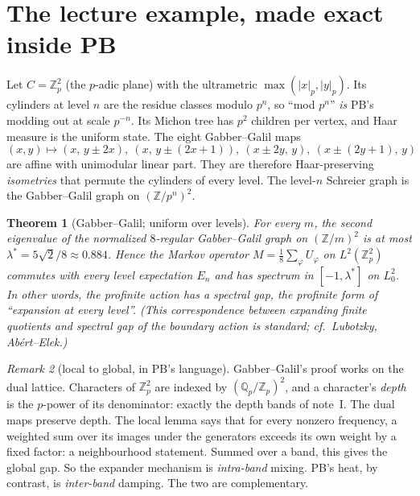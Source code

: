 \documentclass[11pt]{article}
\newtheorem{theorem}{Theorem}[section]
\theoremstyle{definition}
\theoremstyle{remark}
\newtheorem{remark}[theorem]{Remark}
\newcommand{\Z}{\mathbb Z}
\newcommand{\Q}{\mathbb Q}
\begin{document}
\section{The lecture example, made exact inside PB}\label{sec:gg}

Let $C=\Z_p^2$ (the $p$-adic plane) with the ultrametric $\max(|x|_p,|y|_p)$. Its cylinders at level $n$ are the residue classes modulo $p^n$, so ``mod $p^n$'' \emph{is} PB's modding out at scale $p^{-n}$. Its Michon tree has $p^2$ children per vertex, and Haar measure is the uniform state. The eight Gabber--Galil maps
\[(x,y)\mapsto(x,\,y\pm2x),\ (x,\,y\pm(2x+1)),\ (x\pm2y,\,y),\ (x\pm(2y+1),\,y)\]
are affine with unimodular linear part. They are therefore Haar-preserving \emph{isometries} that permute the cylinders of every level. The level-$n$ Schreier graph is the Gabber--Galil graph on $(\Z/p^n)^2$.

\begin{theorem}[Gabber--Galil; uniform over levels]
For every $m$, the second eigenvalue of the normalized $8$-regular Gabber--Galil graph on $(\Z/m)^2$ is at most $\lambda^*=5\sqrt2/8\approx0.884$. Hence the Markov operator $M=\frac18\sum_\varphi U_\varphi$ on $L^2(\Z_p^2)$ commutes with every level expectation $E_n$ and has spectrum in $[-1,\lambda^*]$ on $L^2_0$. In other words, the profinite action has a spectral gap, the profinite form of ``expansion at every level''. (This correspondence between expanding finite quotients and spectral gap of the boundary action is standard; cf.\ Lubotzky, Ab\'ert--Elek.)
\end{theorem}

\begin{remark}[local to global, in PB's language]
Gabber--Galil's proof works on the dual lattice. Characters of $\Z_p^2$ are indexed by $(\Q_p/\Z_p)^2$, and a character's \emph{depth} is the $p$-power of its denominator: exactly the depth bands of note~I. The dual maps preserve depth. The local lemma says that for every nonzero frequency, a weighted sum over its images under the generators exceeds its own weight by a fixed factor: a neighbourhood statement. Summed over a band, this gives the global gap. So the expander mechanism is \emph{intra-band} mixing. PB's heat, by contrast, is \emph{inter-band} damping. The two are complementary.
\end{remark}
\end{document}
